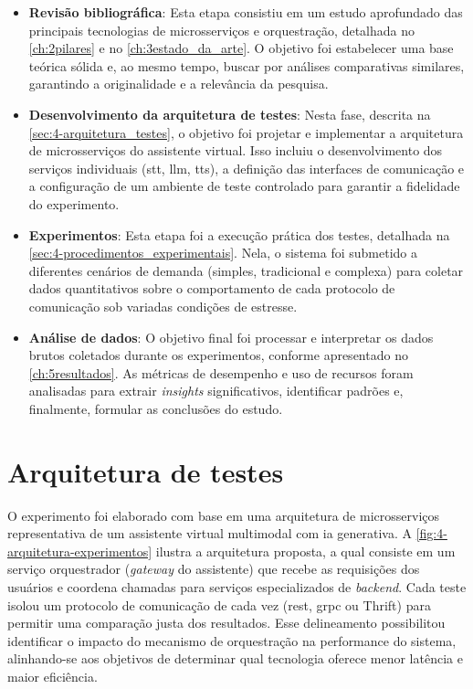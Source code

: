 \begin{itemize}
    \item \textbf{Revisão bibliográfica}: Esta etapa consistiu em um estudo aprofundado das principais tecnologias de microsserviços e orquestração, detalhada no \autoref{ch:2pilares} e no \autoref{ch:3estado_da_arte}. O objetivo foi estabelecer uma base teórica sólida e, ao mesmo tempo, buscar por análises comparativas similares, garantindo a originalidade e a relevância da pesquisa.
    
    \item \textbf{Desenvolvimento da arquitetura de testes}: Nesta fase, descrita na \autoref{sec:4-arquitetura_testes}, o objetivo foi projetar e implementar a arquitetura de microsserviços do assistente virtual. Isso incluiu o desenvolvimento dos serviços individuais (\acrshort{stt}, \acrshort{llm}, \acrshort{tts}), a definição das interfaces de comunicação e a configuração de um ambiente de teste controlado para garantir a fidelidade do experimento.
    
    \item \textbf{Experimentos}: Esta etapa foi a execução prática dos testes, detalhada na \autoref{sec:4-procedimentos_experimentais}. Nela, o sistema foi submetido a diferentes cenários de demanda (simples, tradicional e complexa) para coletar dados quantitativos sobre o comportamento de cada protocolo de comunicação sob variadas condições de estresse.
    
    \item \textbf{Análise de dados}: O objetivo final foi processar e interpretar os dados brutos coletados durante os experimentos, conforme apresentado no \autoref{ch:5resultados}. As métricas de desempenho e uso de recursos foram analisadas para extrair \textit{insights} significativos, identificar padrões e, finalmente, formular as conclusões do estudo.
\end{itemize}



\section{Arquitetura de testes}
\label{sec:4-arquitetura_testes}

O experimento foi elaborado com base em uma arquitetura de microsserviços representativa de um assistente virtual multimodal com \acrfull{ia} generativa. A \autoref{fig:4-arquitetura-experimentos} ilustra a arquitetura proposta, a qual consiste em um serviço orquestrador (\textit{gateway} do assistente) que recebe as requisições dos usuários e coordena chamadas para serviços especializados de \textit{backend}. Cada teste isolou um protocolo de comunicação de cada vez (\gls{rest}, \gls{grpc} ou Thrift) para permitir uma comparação justa dos resultados. Esse delineamento possibilitou identificar o impacto do mecanismo de orquestração na performance do sistema, alinhando-se aos objetivos de determinar qual tecnologia oferece menor latência e maior eficiência. 


